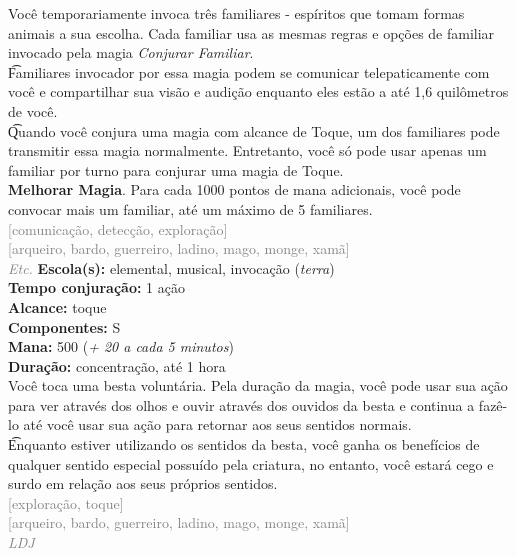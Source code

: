 \documentclass{RPG_Adventure}[2021/10/20]
\begin{document}
{\normalsize Você temporariamente invoca três familiares - espíritos que tomam formas animais a sua escolha. Cada familiar usa as mesmas regras e opções de familiar invocado pela magia \textit{Conjurar Familiar}.\\\t Familiares invocador por essa magia podem se comunicar telepaticamente com você e compartilhar sua visão e audição enquanto eles estão a até 1,6 quilômetros de você.\\\t Quando você conjura uma magia com alcance de Toque, um dos familiares pode transmitir essa magia normalmente. Entretanto, você só pode usar apenas um familiar por turno para conjurar uma magia de Toque.\\\t \textbf{Melhorar Magia}. Para cada 1000 pontos de mana adicionais, você pode convocar mais um familiar, até um máximo de 5 familiares.\\}
{\scriptsize \textcolor{gray}{[comunicação, detecção, exploração]\\}}
{\scriptsize \textcolor{gray}{[arqueiro, bardo, guerreiro, ladino, mago, monge, xamã]\\}}
{\tiny \textcolor{gray}{\textit{Etc.}}}\jump{}
{\small \t \textbf{Escola(s):} elemental, musical, invocação (\textit{terra})\\\t \textbf{Tempo conjuração:} 1 ação\\\t \textbf{Alcance:} toque\\\t \textbf{Componentes:} S\\\t \textbf{Mana:} 500 (\textit{+ 20 a cada 5 minutos})\\\t \textbf{Duração:} concentração, até 1 hora\\}
{\normalsize Você toca uma besta voluntária. Pela duração da magia, você pode usar sua ação para ver através dos olhos e ouvir através dos ouvidos da besta e continua a fazê-lo até você usar sua ação para retornar aos seus sentidos normais.\\\t Enquanto estiver utilizando os sentidos da besta, você ganha os benefícios de qualquer sentido especial possuído pela criatura, no entanto, você estará cego e surdo em relação aos seus próprios sentidos.\\}
{\scriptsize \textcolor{gray}{[exploração, toque]\\}}
{\scriptsize \textcolor{gray}{[arqueiro, bardo, guerreiro, ladino, mago, monge, xamã]\\}}
{\tiny \textcolor{gray}{\textit{LDJ}}}\jump

\end{document}
